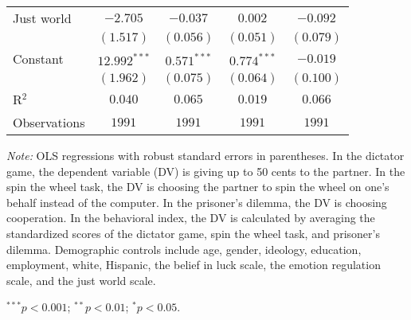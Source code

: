 \begin{table}[!t]
\begin{center}
{\begin{threeparttable}
\begin{tabular}{l c c c c}
Just world                   & $-2.705$       & $-0.037$       & $0.002$       & $-0.092$       \\
                             & $(1.517)$      & $(0.056)$      & $(0.051)$     & $(0.079)$      \\
Constant                     & $12.992^{***}$ & $0.571^{***}$  & $0.774^{***}$ & $-0.019$       \\
                             & $(1.962)$      & $(0.075)$      & $(0.064)$     & $(0.100)$      \\
\midrule
R$^2$                        & $0.040$        & $0.065$        & $0.019$       & $0.066$        \\
Observations                 & $1991$         & $1991$         & $1991$        & $1991$         \\
\bottomrule
\end{tabular}
\begin{tablenotes}[flushleft]
\scriptsize{\item[\hspace{-5mm}] \textit{Note:} OLS regressions with robust standard errors in parentheses. 
                                In the dictator game, the dependent variable (DV) is giving up to 50 cents to the partner. 
                                In the spin the wheel task, the DV is choosing the partner to spin the wheel on one’s behalf instead of the computer. 
                                In the prisoner’s dilemma, the DV is choosing cooperation. 
                                In the behavioral index, the DV is calculated by averaging the standardized scores of the dictator game, spin the wheel task, and prisoner's dilemma.
                                Demographic controls include age, gender, ideology,
                                education, employment, white, Hispanic, the belief in luck scale, the emotion regulation scale, and the just world scale. \item[\hspace{-5mm}] $^{***}p<0.001$; $^{**}p<0.01$; $^{*}p<0.05$.}
\end{tablenotes}
\end{threeparttable}
}
\label{tab:behavior_regression_emotional_demographic}
\end{center}
\end{table}

\renewcommand{\baselinestretch}{1.67}%
